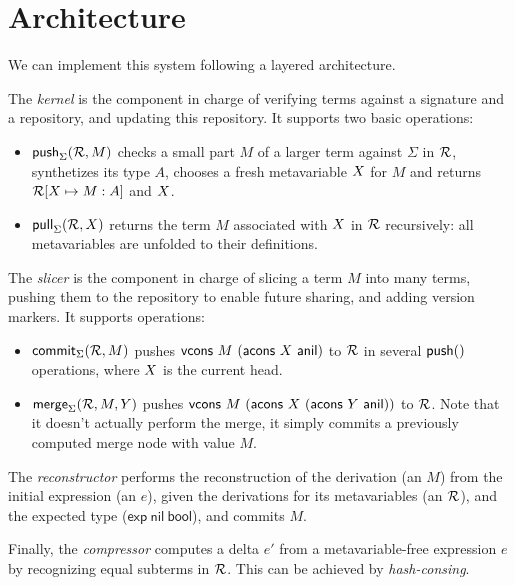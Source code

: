 \documentclass[9pt]{sigplanconf}
\begin{document}
\section{Architecture}

We can implement this system following a layered architecture.

The \emph{kernel} is the component in charge of verifying terms
against a signature and a repository, and updating this repository. It
supports two basic operations:
\begin{itemize}
\item ${\rm\mathsf{push}}_{\Sigma}({\mathcal{R},M})$ checks a small part $M$ of a
  larger term against $\Sigma$ in $\mathcal{R}$, synthetizes its type $A$,
  chooses a fresh metavariable $\mmeta$ for $M$ and returns
  $\mr[\mmeta\mapsto M:A]$ and $\mmeta$.
\item $\pfunction{pull}\Sigma{\mr, \mmeta}$ returns the term $M$
  associated with $\mmeta$ in $\mathcal{R}$ recursively: all metavariables are
  unfolded to their definitions.
\end{itemize}

The \emph{slicer} is the component in charge of slicing a term $M$
into many terms, pushing them to the repository to enable future
sharing, and adding version markers. It supports operations:
\begin{itemize}
\item ${\rm\mathsf{commit}}_{\Sigma}({\mathcal{R}, M})$ pushes $\mathsf{vcons}\ M\
  (\mathsf{acons}\ \mmeta\ \mathsf{anil})$ to $\mathcal{R}$ in several
  ${\rm\mathsf{push}}({})$ operations, where $\mmeta$ is the current head.
\item $\pfunction{merge}\Sigma{\mr, M, \mmmeta}$ pushes
  $\mathsf{vcons}\ M\ (\mathsf{acons}\ \mmeta\ (\mathsf{acons}\
  \mmmeta\ \mathsf{anil}))$ to $\mathcal{R}$. Note that it doesn't actually
  perform the merge, it simply commits a previously computed merge
  node with value $M$.
\end{itemize}

The \emph{reconstructor} performs the reconstruction of the derivation
(an $M$) from the initial expression (an $e$), given the
derivations for its metavariables (an $\mathcal{R}$), and the expected type
($\mathsf{exp}\ \mathsf{nil}\ \mathsf{bool}$), and commits $M$.

Finally, the \emph{compressor} computes a delta $e'$ from a
metavariable-free expression $e$ by recognizing equal subterms in
$\mathcal{R}$. This can be achieved by \emph{hash-consing}.






\end{document}
